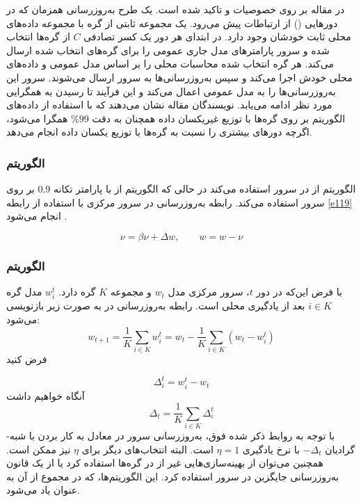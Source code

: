 در مقاله \cite{Fed1} بر روی خصوصیات  و  تاکید شده است. یک طرح به‌روزرسانی همزمان که در دورهایی () از ارتباطات پیش می‌رود. یک مجموعه ثابتی از  گره با مجموعه داده‌های محلی ثابت خودشان وجود دارد. در ابتدای هر دور یک کسر تصادفی $C$ از گره‌ها انتخاب شده و سرور پارامترهای مدل جاری عمومی را برای گره‌های انتخاب شده ارسال می‌کند. هر گره انتخاب شده محاسبات محلی را بر اساس مدل عمومی و داده‌های محلی خودش اجرا می‌کند و سپس به‌روزرسانی‌ها به سرور ارسال می‌شوند. سرور این به‌روزرسانی‌ها را به مدل عمومی اعمال می‌کند و این فرآیند تا رسیدن به همگرایی مورد نظر ادامه می‌یابد. نویسندگان مقاله نشان می‌دهند که با استفاده از داده‌های  الگوریتم  بر روی گره‌ها با توزیع غیریکسان داده‌ همچنان به دقت $\%99 $ همگرا می‌شود، اگرچه دور‌های بیشتری را نسبت به گره‌ها با توزیع یکسان داده انجام می‌دهد.

\subsubsection{الگوریتم }
الگوریتم  از  در سرور استفاده می‌کند در حالی که الگوریتم  از  با پارامتر تکانه $0.9$ بر روی سرور استفاده می‌کند. رابطه به‌روزرسانی در سرور مرکزی با استفاده از رابطه \ref{e119} انجام می‌شود \cite{Fed5}.

\begin{equation}\label{e119}
	\nu =\beta\nu+\Delta w,\qquad w=w-\nu
\end{equation}

\subsubsection{الگوریتم }
با فرض این‌که در دور $t$، سرور مرکزی مدل $w_t$ و مجموعه $K$ گره‌ دارد. $w_i^t $ مدل گره $i\in K$ بعد از یادگیری محلی است. رابطه به‌روزرسانی در  به صورت زیر بازنویسی می‌شود:
\begin{equation}\label{e120}
	w_{t+1}=\frac{1}{K}\sum_{i\in K}w_i^t=w_t - \frac{1}{K}\sum_{i\in K}(w_t-w_i^t)
\end{equation}
فرض کنید 

\begin{equation}\label{e121}
	\Delta_i^t=w_i^t-w_t
\end{equation}
آنگاه خواهیم داشت
\begin{equation}\label{e122}
	\Delta_t=\frac{1}{K}\sum_{i\in K}\Delta_i^t
\end{equation}
با توجه به روابط ذکر شده فوق، به‌روزرسانی سرور در  معادل به کار بردن  با شبه‌-گرادیان $-\Delta_t$ با نرخ یادگیری $\eta=1$ است. البته انتخاب‌های دیگر برای $\eta$ نیز ممکن است. همچنین می‌توان از بهینه‌سازی‌هایی غیر از  در گره‌ها استفاده کرد یا از یک قانون به‌روزرسانی جایگزین در سرور استفاده کرد. این الگوریتم‌ها، که در مجموع از آن به عنوان  یاد می‌شود\cite{Fed6}.

